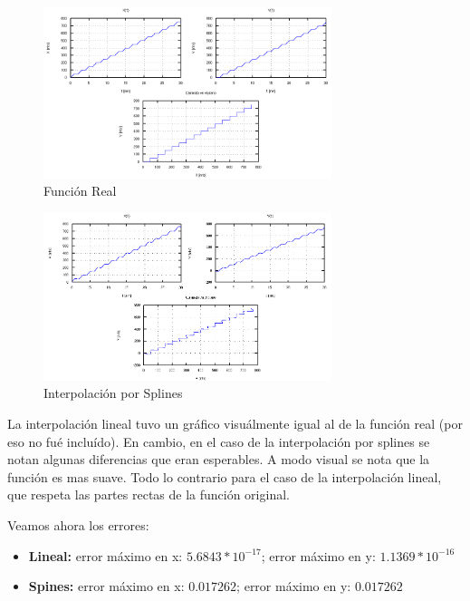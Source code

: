 \documentclass[a4paper,10pt]{article}
\begin{document}
\FloatBarrier
\begin{figure}[h]
  \centering
    \includegraphics[width=0.75\textwidth]{imagenes/Kane_Real.png}
  \caption{Función Real}
\end{figure}
\FloatBarrier
\begin{figure}[h]
  \centering
    \includegraphics[width=0.75\textwidth]{imagenes/Kane_Splines.png}
  \caption{Interpolación por Splines}
\end{figure}
\FloatBarrier

\par La interpolación lineal tuvo un gráfico visuálmente igual al de la función real (por eso no fué incluído). En cambio, en el caso de la interpolación por splines se notan algunas diferencias que eran esperables. A modo visual se nota que la función es mas suave. Todo lo contrario para el caso de la interpolación lineal, que respeta las partes rectas de la función original.

\par Veamos ahora los errores:

\begin{itemize}
	\item \textbf{Lineal:} error máximo en x: $5.6843 * 10^{-17}$; error máximo en y: $1.1369 * 10^{-16}$
	\item \textbf{Spines:} error máximo en x: $0.017262$; error máximo en y: $0.017262$
\end{itemize}
\end{document}
